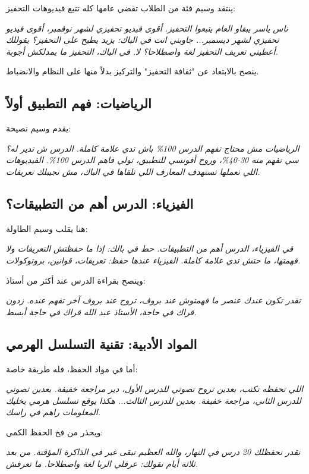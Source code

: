 \documentclass[12pt,a4paper]{book}
\newcommand{\quoteAr}[1]{%
	\begin{myquote}
		\itshape #1
	\end{myquote}
}
\begin{document}
	ينتقد وسيم فئة من الطلاب تقضي عامها كله تتبع فيديوهات التحفيز:
	
	\quoteAr{ناس ياسر يبقاو العام يتبعوا التحفيز. أقوى فيديو تحفيزي لشهر نوفمبر، أقوى فيديو تحفيزي لشهر ديسمبر... جاوبني انت في الباك: يزيد يطيح على التحفيز؟ يقوللك أعطيني تعريف التحفيز لغة واصطلاحا؟ لا. في الباك، التحفيز ما يمدلكش أجوبة.}
	
	ينصح بالابتعاد عن "ثقافة التحفيز" والتركيز بدلاً منها على النظام والانضباط.

	\subsection{الرياضيات: فهم التطبيق أولاً}
	
	يقدم وسيم نصيحة:
	
	\quoteAr{الرياضيات مش محتاج تفهم الدرس 100\% باش تدي علامة كاملة. الدرس ش تدير له؟ سي تفهم منه 30-40\%، وروح أفونسي للتطبيق، تولي فاهم الدرس 100\%. الفيديوهات اللي نعملها نستهدف المعارف اللي تلقاها في الباك، مش نجيبلك تعريفات.}
	
	\subsection{الفيزياء: الدرس أهم من التطبيقات؟}
	
	هنا يقلب وسيم الطاولة:
	
	\quoteAr{في الفيزياء، الدرس أهم من التطبيقات. حط في بالك: إذا ما حفظتش التعريفات ولا فهمتها، ما حتش تدي علامة كاملة. الفيزياء عندها حفظ: تعريفات، قوانين، بروتوكولات.}
	
	وينصح بقراءة الدرس عند أكثر من أستاذ:
	
	\quoteAr{تقدر تكون عندك عنصر ما فهمتوش عند بروف، تروح عند بروف آخر تفهم عنده. زدون قراك في حاجة، الأستاذ عبد الله قراك في حاجة أبسط.}
	
	\subsection{المواد الأدبية: تقنية التسلسل الهرمي}
	
	أما في مواد الحفظ، فله طريقة خاصة:
	
	\quoteAr{اللي تحفظه تكتب، بعدين تروح تصوتي للدرس الأول، دير مراجعة خفيفة. بعدين تصوتي للدرس الثاني، مراجعة خفيفة. بعدين للدرس الثالث... هكذا يوقع تسلسل هرمي يخليك المعلومات راهم في راسك.}
	
	ويحذر من فخ الحفظ الكمي:
	
	\quoteAr{نقدر نحفظلك 20 درس في النهار، والله العظيم تبقى غير في الذاكرة المؤقتة. من بعد ثلاثة أيام نقولك: عرفلي الربا لغة واصطلاحا. ما تعرفش.}
	
\end{document}
